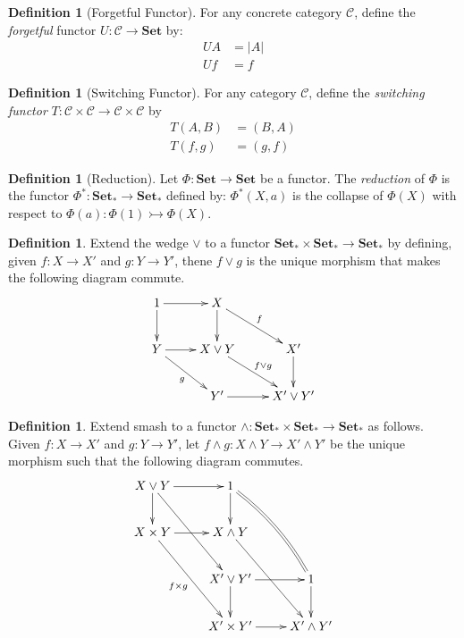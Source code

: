 \documentclass{book}
\theoremstyle{definition}
\newtheorem{df}[ax]{Definition}
\newcommand{\Set}{\ensuremath{\mathbf{Set}}}
\begin{document}
\begin{df}[Forgetful Functor]
For any concrete category $\mathcal{C}$, define the \emph{forgetful} functor $U : \mathcal{C} \rightarrow \Set$ by:
\begin{align*}
U A & = |A| \\
U f & = f
\end{align*}
\end{df}

\begin{df}[Switching Functor]
For any category $\mathcal{C}$, define the \emph{switching functor} $T : \mathcal{C} \times \mathcal{C} \rightarrow \mathcal{C} \times \mathcal{C}$ by
\begin{align*}
T(A,B) & = (B,A) \\
T(f,g) & = (g,f)
\end{align*}
\end{df}

\begin{df}[Reduction]
Let $\Phi : \Set \rightarrow \Set$ be a functor. The \emph{reduction} of $\Phi$ is the functor $\Phi^* : \Set_* \rightarrow \Set_*$ defined by: $\Phi^*(X,a)$ is the collapse of $\Phi(X)$ with respect to $\Phi(a) : \Phi(1) \rightarrowtail \Phi(X)$.
\end{df}

\begin{df}
Extend the wedge $\vee$ to a functor $\Set_* \times \Set_* \rightarrow \Set_*$ by defining, given $f : X \rightarrow X'$ and $g : Y \rightarrow Y'$, thene $f \vee g$ is the unique morphism that makes the following diagram commute.
\[ \xymatrix{
1 \ar[r] \ar[d] & X \ar[d] \ar[dr]^f \\
Y \ar[r] \ar[dr]_g & X \vee Y \ar[dr]^{f \vee g} & X' \ar[d] \\
& Y' \ar[r] & X' \vee Y'
} \]
\end{df}

\begin{df}
Extend smash to a functor $\wedge : \Set_* \times \Set_* \rightarrow \Set_*$ as follows. Given $f : X \rightarrow X'$ and $g : Y \rightarrow Y'$, let $f \wedge g : X \wedge Y \rightarrow X' \wedge Y'$ be the unique morphism such that the following diagram commutes.
\[ \xymatrix{
X \vee Y \ar[r] \ar[d] \ar[ddr] & 1 \ar[d] \ar@{=}@/^/[ddr] \\
X \times Y \ar[r] \ar[ddr]_{f \times g} & X \wedge Y \ar[ddr] \\
& X' \vee Y' \ar[r] \ar[d] & 1 \ar[d]\\\
& X' \times Y' \ar[r] & X' \wedge Y'
} \]
\end{df}
\end{document}
